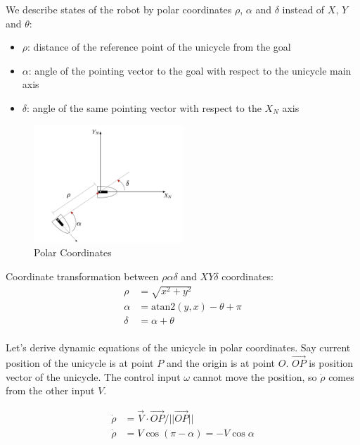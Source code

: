 \documentclass[twoside]{article}
\begin{document}
We describe states of the robot by polar coordinates $\rho$, $\alpha$ and $\delta$ instead of $X$, $Y$ and $\theta$:
\begin{itemize}
  \item $\rho$: distance of the reference point of the unicycle from the goal
  \item $\alpha$: angle of the pointing vector to the goal with respect to the unicycle main axis
  \item $\delta$: angle of the same pointing vector with respect to the $X_N$ axis
\end{itemize}

\begin{figure}[h]
\centering
\includegraphics[width=0.5\textwidth]{RhoAlphaDelta.png}
\caption{Polar Coordinates}
\label{RhoAlphaDeltaFigure}
\end{figure}

Coordinate transformation between $\rho\alpha\delta$ and $XY\delta$ coordinates:
\begin{equation} \label{coordinate transformation}
\begin{split}
\rho &= \sqrt{x^2+y^2} \\
\alpha &= \mathrm{atan2}(y, x) - \theta + \pi \\
\delta &= \alpha + \theta \\
\end{split}
\end{equation}

Let's derive dynamic equations of the unicycle in polar coordinates. Say current position of the unicycle is at point $P$ and the origin is at point $O$. $\overrightarrow{OP}$ is position vector of the unicycle. The control input $\omega$ cannot move the position, so $\dot{\rho}$ comes from the other input $V$.

\begin{equation} \label{dotrho}
\begin{split}
\dot{\rho} &= \vec{V} \cdot \overrightarrow{OP}/||\overrightarrow{OP}|| \\
\dot{\rho} &= V \cos(\pi - \alpha) = -V \cos\alpha \\
\end{split}
\end{equation}
\end{document}
